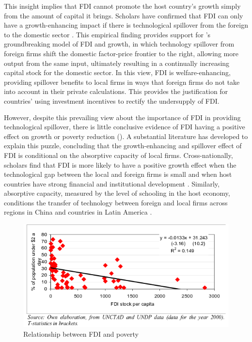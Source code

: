 This insight implies that FDI cannot promote the host country's growth simply from the amount of capital it brings. Scholars have confirmed that FDI can only have a growth-enhancing impact if there is technological spillover from the foreign to the domestic sector \citep{Nunnenkamp2004}. This empirical finding provides support for \citet{Findlay1978}'s groundbreaking model of FDI and growth, in which technology spillover from foreign firms shift the domestic factor-price frontier to the right, allowing more output from the same input, ultimately resulting in a continually increasing capital stock for the domestic sector. In this view, FDI is welfare-enhancing, providing spillover benefits to local firms in ways that foreign firms do not take into account in their private calculations. This provides the justification for countries' using investment incentives to rectify the undersupply of FDI. 

However, despite this prevailing view about the importance of FDI in providing technological spillover, there is little conclusive evidence of FDI having a positive effect on growth \citep{Nair-Reichert2001, Carkovic2002} or poverty reduction \citep{Guerra2009} (). A substantial literature has developed to explain this puzzle, concluding that the growth-enhancing and spillover effect of FDI is conditional on the absorptive capacity of local firms. Cross-nationally, scholars find that FDI is more likely to have a positive growth effect when the technological gap between the local and foreign firms is small \citep{Nunnenkamp2004} and when host countries have strong financial and institutional development \citep{Durham2004}. Similarly, absorptive capacity, measured by the level of schooling in the host economy, conditions the transfer of technology between foreign and local firms across regions in China \citep{Fu2008} and countries in Latin America \citep{Willem2004}.

\begin{figure}[!ht]
\includegraphics[width=\textwidth, height=\textheight,keepaspectratio]{../figure/fdi_poverty}
\caption{Relationship between FDI and poverty}
\label{fig:fdipoverty}
\end{figure}

